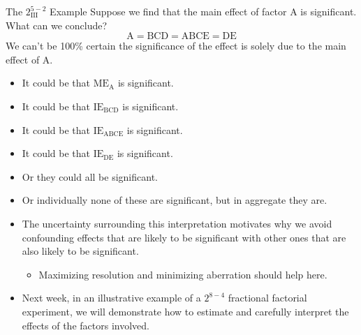 \begin{itemize}
            \begin{Example}{The $ 2^{5-2}_{\text{III}} $ Example}{}
                  Suppose we find that the main effect of factor A is significant. What can we conclude?
                  \[ \text{A}=\text{BCD}=\text{ABCE}=\text{DE} \]
                  We can't be 100\% certain the significance of the effect is solely due to the main effect of A.
                  \begin{itemize}[\bullet]
                        \item It could be that $ \text{ME}_\text{A} $ is significant.
                        \item It could be that $ \text{IE}_\text{BCD} $ is significant.
                        \item It could be that $ \text{IE}_\text{ABCE} $ is significant.
                        \item It could be that $ \text{IE}_\text{DE} $ is significant.
                        \item Or they could all be significant.
                        \item Or individually none of these are significant, but in aggregate they are.
                  \end{itemize}
            \end{Example}
\end{itemize}
\begin{itemize}[*]
      \item The uncertainty surrounding this interpretation motivates why we avoid confounding effects that are
            likely to be significant with other ones that are also likely to be significant.
            \begin{itemize}[$\hookrightarrow$]
                  \item Maximizing resolution and minimizing aberration should help here.
            \end{itemize}
      \item Next week, in an illustrative example of a $ 2^{8-4} $ fractional factorial experiment, we will demonstrate
            how to estimate and carefully interpret the effects of the factors involved.
\end{itemize}
